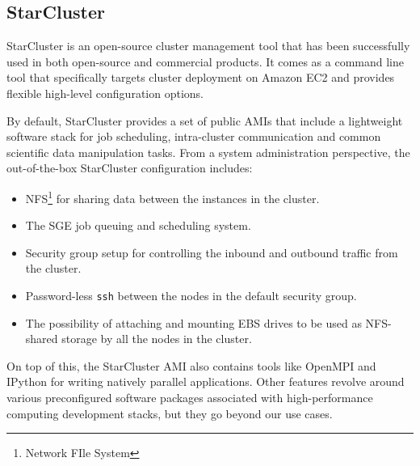 \subsection{StarCluster}

StarCluster \cite{StarCluster} is an open-source cluster management tool that has been successfully used in both open-source and commercial products. It comes as a command line tool that specifically targets cluster deployment on Amazon EC2 and provides flexible high-level configuration options.

By default, StarCluster provides a set of public AMIs that include a lightweight software stack for job scheduling, intra-cluster communication and common scientific data manipulation tasks. From a system administration perspective, the out-of-the-box StarCluster configuration includes:
\begin{itemize}
	\item NFS\footnote{Network FIle System} \cite{NFS} for sharing data between the instances in the cluster.
	\item The SGE job queuing and scheduling system.
	\item Security group setup for controlling the inbound and outbound traffic from the cluster.
	\item Password-less \verb|ssh| between the nodes in the default security group.
	\item The possibility of attaching and mounting EBS drives to be used as NFS-shared storage by all the nodes in the cluster.
\end{itemize}

On top of this, the StarCluster AMI also contains tools like OpenMPI \cite{OpenMPI} and IPython \cite{IPython} for writing natively parallel applications. Other features revolve around various preconfigured software packages associated with high-performance computing development stacks, but they go beyond our use cases.


